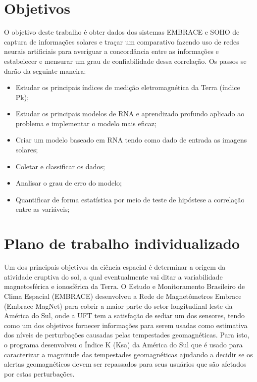 \documentclass[12pt,2024]{uftpibic}
\begin{document}
\vspace{1.5cm}
\chapter{Objetivos}

O objetivo deste trabalho é obter dados dos sistemas EMBRACE e SOHO de captura de informações solares e traçar um comparativo fazendo uso de redes neurais artificiais para averiguar a concordância entre as informações e estabelecer e mensurar um grau de confiabilidade dessa correlação. Os passos se darão da seguinte maneira:

\begin{itemize}
\item Estudar os principais índices de medição eletromagnética da Terra (índice Pk);
\item Estudar os principais modelos de RNA e aprendizado profundo aplicado ao problema e implementar o modelo mais eficaz;
\item Criar um modelo baseado em RNA tendo como dado de entrada as imagens solares;
\item Coletar e classificar os dados;
\item Analisar o grau de erro do modelo;
\item Quantificar de forma estatística por meio de teste de hipóstese a correlação entre as variáveis;
\end{itemize}


\vspace{1.5cm}
\chapter{Plano de trabalho individualizado}

Um dos principais objetivos da ciência espacial é determinar a origem da atividade eruptiva do sol, a qual eventualmente vai ditar a variabilidade magnetosférica e ionosférica da Terra. O Estudo e Monitoramento Brasileiro de Clima Espacial (EMBRACE) desenvolveu a Rede de Magnetômetros Embrace (Embrace MagNet) para cobrir a maior parte do setor longitudinal leste da América do Sul, onde a UFT tem a satisfação de sediar um dos sensores, tendo como um dos objetivos fornecer informações para serem usadas como estimativa dos níveis de perturbações causadas pelas tempestades geomagnéticas. Para isto, o programa desenvolveu o Índice K (Ksa) da América do Sul que é usado para caracterizar a magnitude das tempestades geomagnéticas ajudando a decidir se os alertas geomagnéticos devem ser repassados para seus usuários que são afetados por estas perturbações.
\end{document}
